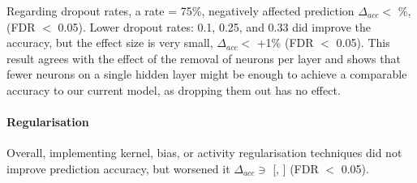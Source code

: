 Regarding dropout rates, a rate = 75\%, negatively affected prediction  $\Delta_{acc} <$ \%,(FDR $<$ 0.05). Lower dropout rates: 0.1, 0.25, and 0.33 did improve the accuracy, but the effect size is very small, $\Delta_{acc} <$ +1\% (FDR $<$ 0.05). This result agrees with the effect of the removal of neurons per layer and shows that fewer neurons on a single hidden layer might be enough to achieve a comparable accuracy to our current model, as dropping them out has no effect.

\paragraph{Regularisation}

Overall, implementing kernel, bias, or activity regularisation techniques did not improve prediction accuracy, but worsened it $\Delta_{acc} \ni$ [, ] (FDR $<$ 0.05).

